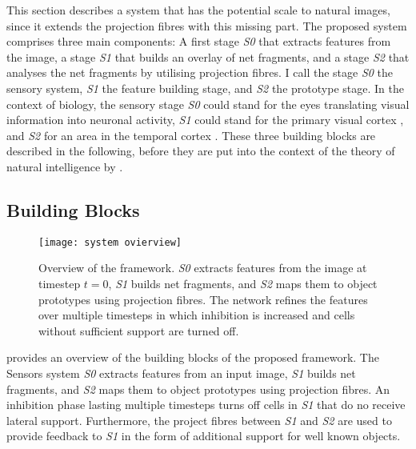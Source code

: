 This section describes a system that has the potential scale to natural images, since it extends the projection fibres with this missing part.
The proposed system comprises three main components: A first stage \emph{S0} that extracts features from the image, a stage \emph{S1} that builds an overlay of net fragments, and a stage \emph{S2} that analyses the net fragments by utilising projection fibres.
I call the stage \emph{S0} the sensory system, \emph{S1} the feature building stage, and \emph{S2} the prototype stage.
In the context of biology, the sensory stage \emph{S0} could stand for the eyes translating visual information into neuronal activity, \emph{S1} could stand for the primary visual cortex , and \emph{S2} for an area in the temporal cortex .
These three building blocks are described in the following, before they are put into the context of the theory of natural intelligence by .

\subsection{Building Blocks}
\begin{figure}[h]
    \centering
    \texttt{[image: system ovierview]}
    \caption[Overview of the framework]{Overview of the framework. \emph{S0} extracts features from the image at timestep $t=0$, \emph{S1} builds net fragments, and \emph{S2} maps them to object prototypes using projection fibres. The network refines the features over multiple timesteps in which inhibition is increased and cells without sufficient support are turned off.}
\end{figure}

 provides an overview of the building blocks of the proposed framework. The Sensors system \emph{S0} extracts features from an input image, \emph{S1} builds net fragments, and \emph{S2} maps them to object prototypes using projection fibres. An inhibition phase lasting multiple timesteps turns off cells in \emph{S1} that do no receive lateral support. Furthermore, the project fibres between \emph{S1} and \emph{S2} are used to provide feedback to \emph{S1} in the form of additional support for well known objects.

